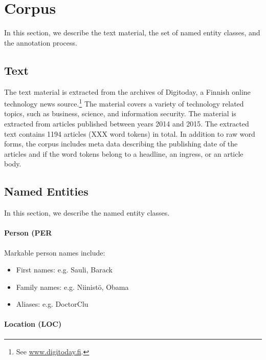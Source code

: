 \documentclass[11pt]{article}
\begin{document}
\section{Corpus}
\label{sec: corpus}

In this section, we describe the text material, the set of named entity classes, and the annotation process.

\subsection{Text}
\label{sec: text}

The text material is extracted from the archives of Digitoday, a Finnish online technology news source.\footnote{See \url{www.digitoday.fi}.} The material covers a variety of technology related topics, such as business, science, and information security.  The material is extracted from articles published between years 2014 and 2015. The extracted text contains 1194 articles (XXX word tokens) in total. In addition to raw word forms, the corpus includes meta data describing the publishing date of the articles and if the word tokens belong to a headline, an ingress, or an article body. 


\subsection{Named Entities}
\label{sec: named entities}

In this section, we describe the named entity classes.



\paragraph{Person (PER}

Markable person names include:

\begin{itemize}

\item[1.] First names: e.g. Sauli, Barack
\item[2.] Family names: e.g. Niinist\"o, Obama
\item[3.] Aliases: e.g. DoctorClu

\end{itemize}



\paragraph{Location (LOC)}
\end{document}
